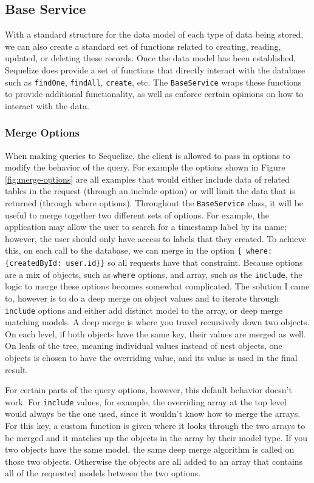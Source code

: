 \subsection{Base Service}
With a standard structure for the data model of each type of data being stored, we can also create a standard set of functions related to creating, reading, updated, or deleting these records.  Once the data model has been established, Sequelize does provide a set of functions that directly interact with the database such as \verb!findOne!, \verb!findAll!, \verb!create!, etc.  The \verb!BaseService! wraps these functions to provide additional functionality, as well as enforce certain opinions on how to interact with the data.

\subsubsection{Merge Options}
When making queries to Sequelize, the client is allowed to pass in options to modify the behavior of the query.  For example the options shown in Figure \ref{fig:merge-options} are all examples that would either include data of related tables in the request (through an include option) or will limit the data that is returned (through where options).  Throughout the \verb!BaseService! class, it will be useful to merge together two different sets of options.  For example, the application may allow the user to search for a timestamp label by its name; however, the user should only have access to labels that they created.  To achieve this, on each call to the database, we can merge in the option \verb!{ where: {createdById: user.id}}! so all requests have that constraint.  Because options are a mix of objects, such as \verb!where! options, and array, such as the \verb!include!, the logic to merge these options becomes somewhat complicated.  The solution I came to, however is to do a deep merge on object values and to iterate through \verb!include! options and either add distinct model to the array, or deep merge matching models.  A deep merge is where you travel recursively down two objects.  On each level, if both objects have the same key, their values are merged as well.  On leafs of the tree, meaning individual values instead of nest objects, one objects is chosen to have the overriding value, and its value is used in the final result.

For certain parts of the query options, however, this default behavior doesn't work.  For \verb!include! values, for example, the overriding array at the top level would always be the one used, since it wouldn't know how to merge the arrays.  For this key, a custom function is given where it looks through the two arrays to be merged and it matches up the objects in the array by their model type.  If you two objects have the same model, the same deep merge algorithm is called on those two objects.  Otherwise the objects are all added to an array that contains all of the requested models between the two options.


